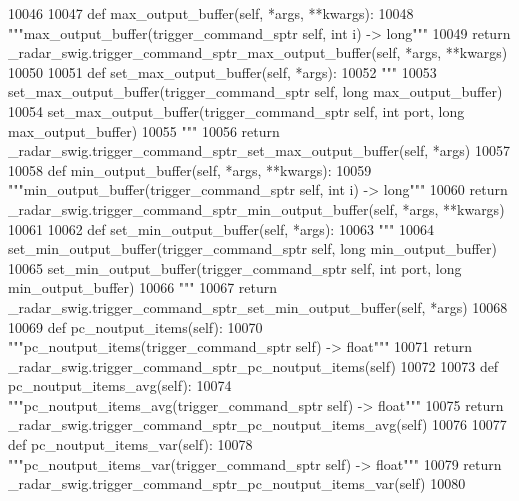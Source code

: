 \begin{DoxyCode}
{{{{{{{{{{{{{{{{{{{{{{{{{{{{{{{{10046 
10047     \textcolor{keyword}{def }max_output_buffer(self, *args, **kwargs):
10048         \textcolor{stringliteral}{"""max\_output\_buffer(trigger\_command\_sptr self, int i) -> long"""}
10049         \textcolor{keywordflow}{return} \_radar\_swig.trigger\_command\_sptr\_max\_output\_buffer(self, *args, **kwargs)
10050 
10051     \textcolor{keyword}{def }set_max_output_buffer(self, *args):
10052         \textcolor{stringliteral}{"""}
10053 \textcolor{stringliteral}{        set\_max\_output\_buffer(trigger\_command\_sptr self, long max\_output\_buffer)}
10054 \textcolor{stringliteral}{        set\_max\_output\_buffer(trigger\_command\_sptr self, int port, long max\_output\_buffer)}
10055 \textcolor{stringliteral}{        """}
10056         \textcolor{keywordflow}{return} \_radar\_swig.trigger\_command\_sptr\_set\_max\_output\_buffer(self, *args)
10057 
10058     \textcolor{keyword}{def }min_output_buffer(self, *args, **kwargs):
10059         \textcolor{stringliteral}{"""min\_output\_buffer(trigger\_command\_sptr self, int i) -> long"""}
10060         \textcolor{keywordflow}{return} \_radar\_swig.trigger\_command\_sptr\_min\_output\_buffer(self, *args, **kwargs)
10061 
10062     \textcolor{keyword}{def }set_min_output_buffer(self, *args):
10063         \textcolor{stringliteral}{"""}
10064 \textcolor{stringliteral}{        set\_min\_output\_buffer(trigger\_command\_sptr self, long min\_output\_buffer)}
10065 \textcolor{stringliteral}{        set\_min\_output\_buffer(trigger\_command\_sptr self, int port, long min\_output\_buffer)}
10066 \textcolor{stringliteral}{        """}
10067         \textcolor{keywordflow}{return} \_radar\_swig.trigger\_command\_sptr\_set\_min\_output\_buffer(self, *args)
10068 
10069     \textcolor{keyword}{def }pc_noutput_items(self):
10070         \textcolor{stringliteral}{"""pc\_noutput\_items(trigger\_command\_sptr self) -> float"""}
10071         \textcolor{keywordflow}{return} \_radar\_swig.trigger\_command\_sptr\_pc\_noutput\_items(self)
10072 
10073     \textcolor{keyword}{def }pc_noutput_items_avg(self):
10074         \textcolor{stringliteral}{"""pc\_noutput\_items\_avg(trigger\_command\_sptr self) -> float"""}
10075         \textcolor{keywordflow}{return} \_radar\_swig.trigger\_command\_sptr\_pc\_noutput\_items\_avg(self)
10076 
10077     \textcolor{keyword}{def }pc_noutput_items_var(self):
10078         \textcolor{stringliteral}{"""pc\_noutput\_items\_var(trigger\_command\_sptr self) -> float"""}
10079         \textcolor{keywordflow}{return} \_radar\_swig.trigger\_command\_sptr\_pc\_noutput\_items\_var(self)
10080 
}}}}}}}}}}}}}}}}}}}}}}}}}}}}}}}}
\end{DoxyCode}
